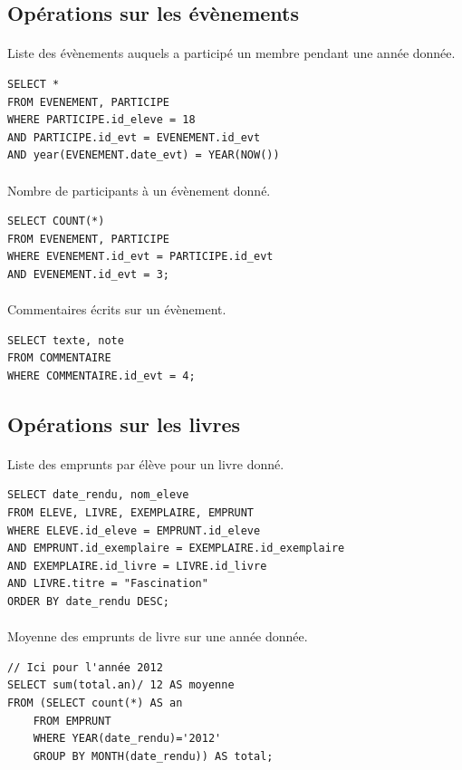 \documentclass[a4paper, 11pt]{article}
\begin{document}
\subsection{Opérations sur les évènements}
\paragraph{}
Liste des évènements auquels a participé un membre pendant une année donnée.
\begin{verbatim}
SELECT *
FROM EVENEMENT, PARTICIPE
WHERE PARTICIPE.id_eleve = 18
AND PARTICIPE.id_evt = EVENEMENT.id_evt
AND year(EVENEMENT.date_evt) = YEAR(NOW())
\end{verbatim}
\paragraph{}
Nombre de participants à un évènement donné.
\begin{verbatim}
SELECT COUNT(*)
FROM EVENEMENT, PARTICIPE
WHERE EVENEMENT.id_evt = PARTICIPE.id_evt
AND EVENEMENT.id_evt = 3;
\end{verbatim}
\paragraph{}
Commentaires écrits sur un évènement.
\begin{verbatim}
SELECT texte, note 
FROM COMMENTAIRE
WHERE COMMENTAIRE.id_evt = 4;
\end{verbatim}
\subsection{Opérations sur les livres}
\paragraph{}
Liste des emprunts par élève pour un livre donné.
\begin{verbatim}
SELECT date_rendu, nom_eleve  
FROM ELEVE, LIVRE, EXEMPLAIRE, EMPRUNT  
WHERE ELEVE.id_eleve = EMPRUNT.id_eleve  
AND EMPRUNT.id_exemplaire = EXEMPLAIRE.id_exemplaire  
AND EXEMPLAIRE.id_livre = LIVRE.id_livre  
AND LIVRE.titre = "Fascination" 
ORDER BY date_rendu DESC;
\end{verbatim}
\paragraph{}
Moyenne des emprunts de livre sur une année donnée.
\begin{verbatim}
// Ici pour l'année 2012
SELECT sum(total.an)/ 12 AS moyenne 
FROM (SELECT count(*) AS an 
    FROM EMPRUNT 
    WHERE YEAR(date_rendu)='2012' 
    GROUP BY MONTH(date_rendu)) AS total;
\end{verbatim}
\end{document}
